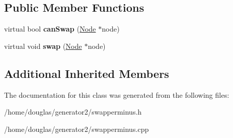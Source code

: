 \subsection*{Public Member Functions}
\begin{DoxyCompactItemize}
\item 
virtual bool {\bfseries can\+Swap} (\hyperlink{classNode}{Node} $\ast$node)\hypertarget{classSwapperMinus_a8beb0fa80bd22b934af250d7b073b265}{}\label{classSwapperMinus_a8beb0fa80bd22b934af250d7b073b265}

\item 
virtual void {\bfseries swap} (\hyperlink{classNode}{Node} $\ast$node)\hypertarget{classSwapperMinus_a11efab75180cc3f0195f4f30309219f3}{}\label{classSwapperMinus_a11efab75180cc3f0195f4f30309219f3}

\end{DoxyCompactItemize}
\subsection*{Additional Inherited Members}


The documentation for this class was generated from the following files\+:\begin{DoxyCompactItemize}
\item 
/home/douglas/generator2/swapperminus.\+h\item 
/home/douglas/generator2/swapperminus.\+cpp\end{DoxyCompactItemize}

